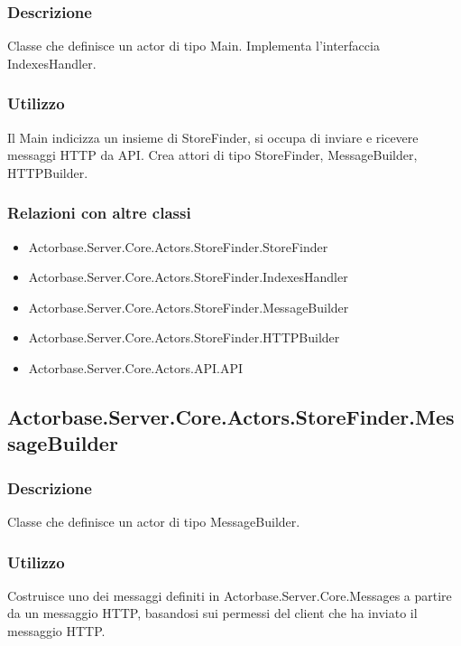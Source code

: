 \documentclass[a4paper]{article}
\begin{document}
			\subsubsection{Descrizione}
				Classe che definisce un actor di tipo Main. Implementa l'interfaccia IndexesHandler.
			\subsubsection{Utilizzo}
				Il Main indicizza un insieme di StoreFinder, si occupa di inviare e ricevere messaggi HTTP da API. Crea attori di tipo StoreFinder, MessageBuilder, HTTPBuilder.
			\subsubsection{Relazioni con altre classi}
			\begin{itemize}
				\item Actorbase.Server.Core.Actors.StoreFinder.StoreFinder
				\item Actorbase.Server.Core.Actors.StoreFinder.IndexesHandler
				\item Actorbase.Server.Core.Actors.StoreFinder.MessageBuilder
				\item Actorbase.Server.Core.Actors.StoreFinder.HTTPBuilder
				\item Actorbase.Server.Core.Actors.API.API
			\end{itemize}

		\subsection{Actorbase.Server.Core.Actors.StoreFinder.MessageBuilder}
			\subsubsection{Descrizione}
				Classe che definisce un actor di tipo MessageBuilder.
			\subsubsection{Utilizzo}
				Costruisce uno dei messaggi definiti in Actorbase.Server.Core.Messages a partire da un messaggio HTTP, basandosi sui permessi del client che ha inviato il messaggio HTTP.
\end{document}
